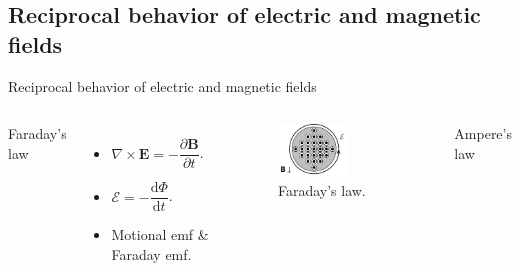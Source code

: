 \subsection{Reciprocal behavior of electric and magnetic fields}

\begin{frame}{Reciprocal behavior of electric and magnetic fields}
    \begin{columns}
        \vspace{-7mm}
        \begin{center}
            \textcolor{BlueDefault}{Faraday's law}
        \end{center}
        
        \begin{itemize}
            \item \( \nabla \times \mathbf{E} = - \dfrac{\partial \mathbf{B}}{\partial t} \).
            \item \( \mathcal{E} = - \dfrac{ \mathrm{d} \Phi }{ \mathrm{d} t }\).
            \item Motional emf \& Faraday emf. \cite{Griffiths_2023}
        \end{itemize}

        \begin{figure}[!htb]
        \centering
        \includegraphics[width=0.6\textwidth]{Figures/Faraday_law.pdf}
        \caption{Faraday's law.}
        \label{Faraday_law}
        \end{figure}

        \vspace{-7mm}

        \begin{center}
            \textcolor{BlueDefault}{Ampere's law}
        \end{center}
        

\end{columns}
\end{frame}
